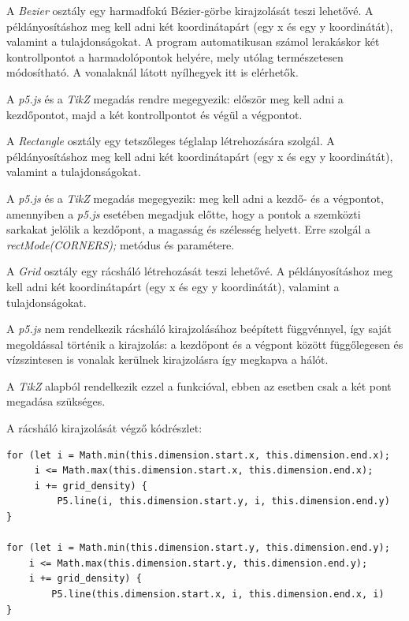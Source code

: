 
A \textit{Bezier} osztály egy harmadfokú Bézier-görbe kirajzolását teszi lehetővé. A példányosításhoz meg kell adni két koordinátapárt (egy x és egy y koordinátát), valamint a tulajdonságokat. A program automatikusan számol lerakáskor két kontrollpontot a harmadolópontok helyére, mely utólag természetesen módosítható. A vonalaknál látott nyílhegyek itt is elérhetők.

A \textit{p5.js} és a \textit{TikZ} megadás rendre megegyezik: először meg kell adni a kezdőpontot, majd a két kontrollpontot és végül a végpontot.


A \textit{Rectangle} osztály egy tetszőleges téglalap létrehozására szolgál. A példányosításhoz meg kell adni két koordinátapárt (egy x és egy y koordinátát), valamint a tulajdonságokat. 

A \textit{p5.js} és a \textit{TikZ} megadás megegyezik: meg kell adni a kezdő- és a végpontot, amennyiben a \textit{p5.js} esetében megadjuk előtte, hogy a pontok a szemközti sarkakat jelölik a kezdőpont, a magasság és szélesség helyett. Erre szolgál a \textit{rectMode(CORNERS);} metódus és paramétere.


A \textit{Grid} osztály egy rácsháló létrehozását teszi lehetővé.  A példányosításhoz meg kell adni két koordinátapárt (egy x és egy y koordinátát), valamint a tulajdonságokat. 

A \textit{p5.js} nem rendelkezik rácsháló kirajzolásához beépített függvénnyel, így saját megoldással történik a kirajzolás: a kezdőpont és a végpont között függőlegesen és vízszintesen is vonalak kerülnek kirajzolásra így megkapva a hálót.

A \textit{TikZ} alapból rendelkezik ezzel a funkcióval, ebben az esetben csak a két pont megadása szükséges.

A rácsháló kirajzolását végző kódrészlet:

\begin{lstlisting}[style=es6, morekeywords={P5}]
for (let i = Math.min(this.dimension.start.x, this.dimension.end.x); 
     i <= Math.max(this.dimension.start.x, this.dimension.end.x); 
     i += grid_density) {
         P5.line(i, this.dimension.start.y, i, this.dimension.end.y)
}

for (let i = Math.min(this.dimension.start.y, this.dimension.end.y); 
    i <= Math.max(this.dimension.start.y, this.dimension.end.y); 
    i += grid_density) {
        P5.line(this.dimension.start.x, i, this.dimension.end.x, i)
}
\end{lstlisting}

